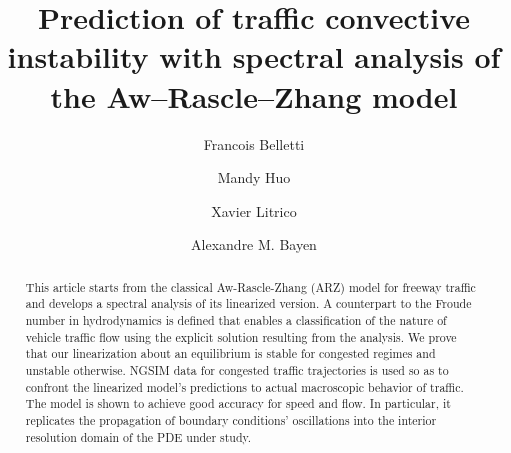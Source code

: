 \documentclass[preprint]{elsarticle}
\begin{document}
\begin{frontmatter}
\title{Prediction of traffic convective instability with spectral analysis of the Aw--Rascle--Zhang model}

\author[EECSAddress]{Francois Belletti}

\author[PhyAddress,MathAddress]{Mandy Huo}

\author[LitricoAddress]{Xavier Litrico}

\author[EECSAddress,CEAddress,ITSAddress]{Alexandre M. Bayen}

\address[EECSAddress]{
Department of Electrical Engineering and Computer Sciences,
University of California, Berkeley,
United States
}

\address[PhyAddress]{
Department of Physics,
University of California, Berkeley,
United States
}

\address[MathAddress]{
Department of Mathematics,
University of California, Berkeley,
United States
}

\address[CEAddress]{
Department of Civil and Environmental Engineering,
University of California, Berkeley,
United States
}

\address[ITSAddress]{
Institute of Transportation Studies
University of California, Berkeley,
United States
}

\address[LitricoAddress]{
LyRE, R\&D center of Lyonnaise des Eaux
91, rue Paulin, 33029 Bordeaux cedex, France
}

%
%
%

\begin{abstract}
This article starts from the classical Aw-Rascle-Zhang (ARZ) model for freeway traffic and develops a spectral analysis of its linearized version. A counterpart to the Froude number in hydrodynamics is defined that enables a classification of the nature of vehicle traffic flow using the explicit solution resulting from the analysis. We prove that our linearization about an equilibrium is stable for congested regimes and unstable otherwise. NGSIM data for congested traffic trajectories is used so as to confront the linearized model's predictions to actual macroscopic behavior of traffic. The model is shown to achieve good accuracy for speed and flow. In particular, it replicates the propagation of boundary conditions' oscillations into the interior resolution domain of the PDE under study.
\end{abstract}


\end{frontmatter}
\end{document}
